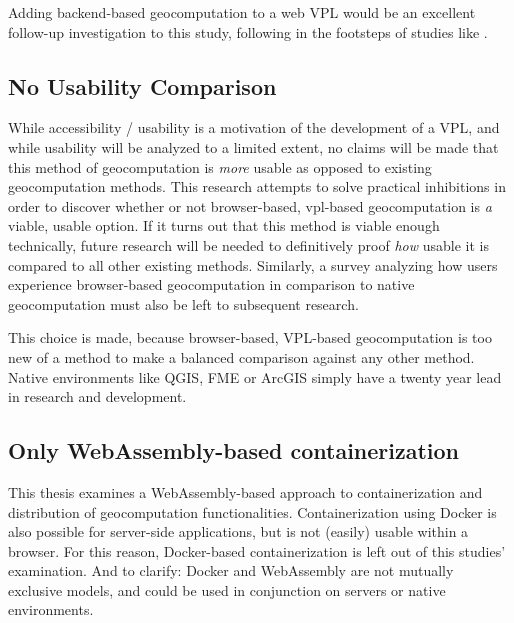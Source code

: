 Adding backend-based geocomputation to a web VPL would be an excellent follow-up investigation to this study, following in the footsteps of studies like \cite{panidi_hybrid_2015}. 

\subsection*{No Usability Comparison} %

While accessibility / usability is a motivation of the development of a \ac{VPL}, and while usability will be analyzed to a limited extent, no claims will be made that this method of geocomputation is \emph{more} usable as opposed to existing geocomputation methods. 
This research attempts to solve practical inhibitions in order to discover whether or not browser-based, vpl-based geocomputation is \emph{a} viable, usable option. If it turns out that this method is viable enough technically, future research will be needed to definitively proof \emph{how} usable it is compared to all other existing methods. 
Similarly, a survey analyzing how users experience browser-based geocomputation in comparison to native geocomputation must also be left to subsequent research. 

This choice is made, because browser-based, VPL-based geocomputation is too new of a method to make a balanced comparison against any other method. Native environments like QGIS, FME or ArcGIS simply have a twenty year lead in research and development. 





\subsection*{Only WebAssembly-based containerization}

This thesis examines a WebAssembly-based approach to containerization and distribution of geocomputation functionalities. 
Containerization using Docker is also possible for server-side applications, but is not (easily) usable within a browser. 
For this reason, Docker-based containerization is left out of this studies' examination. 
And to clarify: Docker and WebAssembly are not mutually exclusive models, and could be used in conjunction on servers or native environments. 

